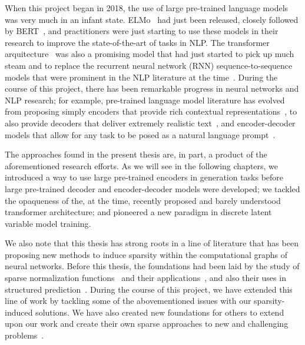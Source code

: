 When this project began in 2018, the use of large pre-trained
language models was very much in an infant state.
ELMo~\citep{peters2018deep} had just been released, closely followed
by BERT~\citep{devlin2018bert}, and practitioners were just starting
to use these models in their research to improve the state-of-the-art
of tasks in NLP. The transformer
arquitecture~\citep{vaswani2017attention} was also a promising model
that had just started to pick up much steam and to replace the
recurrent neural network (RNN) sequence-to-sequence models that were
prominent in the NLP literature at the
time~\citep{bahdanau2014neural}. During the course of this project,
there has been remarkable progress in neural networks and NLP
research; for example, pre-trained language model literature has
evolved from proposing simply encoders that provide rich contextual
representations~\citep{devlin2018bert}, to also provide decoders that
deliver extremely realistic text~\citep[GPT-3;][]{brown2020language},
and encoder-decoder models that allow for any task to be posed as a
natural language
prompt~\citep{raffel2020Exploringlimitstransfer,lewis2020BARTDenoisingSequencetoSequence}.

The approaches found in the present thesis are, in part, a product of
the aforementioned research efforts. As we will see in the following
chapters, we introduced a way to use large pre-trained encoders in
generation tasks before large pre-trained decoder and encoder-decoder
models were developed; we tackled the opaqueness of the, at the time,
recently proposed and barely understood transformer architecture; and
pioneered a new paradigm in discrete latent variable model training.

We also note that this thesis has strong roots in a line of
literature that has been proposing new methods to induce sparsity
within the computational graphs of neural networks. Before this
thesis, the foundations had been laid by the study of sparse
normalization functions~\citep{sparsemax,fusedmax,entmax} and their
applications~\citep{maruf2019selective,malaviya2018sparse}, and also
their uses in structured
prediction~\citep{sparsemap,sparsemapcg}. During the
course of this project, we have extended this line of work by
tackling some of the abovementioned issues with our sparsity-induced
solutions. We have also created new foundations for others to extend
upon our work and create their own sparse approaches to new and
challenging problems~\citep{treviso2021PredictingAttentionSparsity,
    farinhas2022SparseCommunicationMixed}.





\cleardoublepage
\singlespacing
